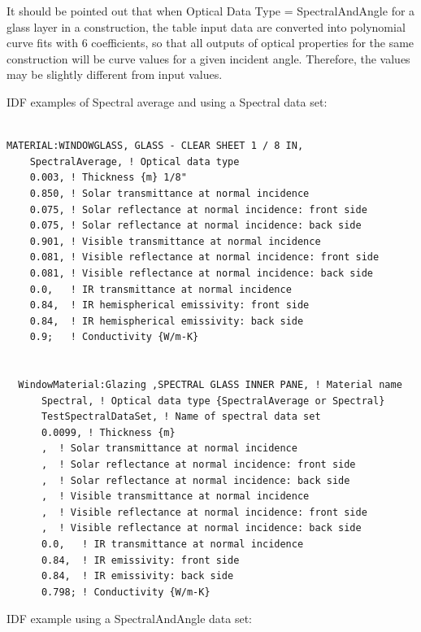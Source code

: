 It should be pointed out that when Optical Data Type = SpectralAndAngle for a glass layer in a construction, the table input data are converted into polynomial curve fits with 6 coefficients, so that all outputs of optical properties for the same construction will be curve values for a given incident angle. Therefore, the values may be slightly different from input values.

IDF examples of Spectral average and using a Spectral data set:

\begin{lstlisting}

MATERIAL:WINDOWGLASS, GLASS - CLEAR SHEET 1 / 8 IN,
    SpectralAverage, ! Optical data type
    0.003, ! Thickness {m} 1/8"
    0.850, ! Solar transmittance at normal incidence
    0.075, ! Solar reflectance at normal incidence: front side
    0.075, ! Solar reflectance at normal incidence: back side
    0.901, ! Visible transmittance at normal incidence
    0.081, ! Visible reflectance at normal incidence: front side
    0.081, ! Visible reflectance at normal incidence: back side
    0.0,   ! IR transmittance at normal incidence
    0.84,  ! IR hemispherical emissivity: front side
    0.84,  ! IR hemispherical emissivity: back side
    0.9;   ! Conductivity {W/m-K}


  WindowMaterial:Glazing ,SPECTRAL GLASS INNER PANE, ! Material name
      Spectral, ! Optical data type {SpectralAverage or Spectral}
      TestSpectralDataSet, ! Name of spectral data set
      0.0099, ! Thickness {m}
      ,  ! Solar transmittance at normal incidence
      ,  ! Solar reflectance at normal incidence: front side
      ,  ! Solar reflectance at normal incidence: back side
      ,  ! Visible transmittance at normal incidence
      ,  ! Visible reflectance at normal incidence: front side
      ,  ! Visible reflectance at normal incidence: back side
      0.0,   ! IR transmittance at normal incidence
      0.84,  ! IR emissivity: front side
      0.84,  ! IR emissivity: back side
      0.798; ! Conductivity {W/m-K}

\end{lstlisting}

IDF example using a SpectralAndAngle data set:

